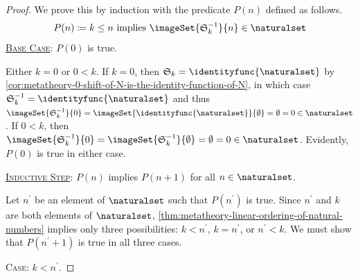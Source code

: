 \begin{proof}
    We prove this by induction with the predicate \( P(n) \) defined as follows.
    \begin{equation*}
        P(n) \coloneq \text{\( k \leq n \) implies \( \imageSet{\mathfrak{S}^{-1}_{k}}{n} \in \naturalset \)}
    \end{equation*}
    \noindent
    \underline{\scshape Base Case}: \( P(0) \) is true.

    \vspace{0.3cm}
    \noindent
    Either \( k = 0 \) or \( 0 < k \).
    If \( k = 0 \), then \( \mathfrak{S}_{k} = \identityfunc{\naturalset} \) by \cref{cor:metatheory-0-shift-of-N-is-the-identity-function-of-N},
    in which case \( \mathfrak{S}_{k}^{-1} = \identityfunc{\naturalset} \) and thus \( \imageSet{\mathfrak{S}^{-1}_{k}}{0} = \imageSet{ \identityfunc{\naturalset} }{\emptyset} = \emptyset = 0 \in \naturalset \).
    If \( 0 < k \), then \( \imageSet{\mathfrak{S}^{-1}_{k}}{0} = \imageSet{\mathfrak{S}^{-1}_{k}}{\emptyset} = \emptyset = 0 \in \naturalset \).
    Evidently, \( P(0) \) is true in either case.

    \vspace{0.3cm}
    \noindent
    \underline{\scshape Inductive Step}: \( P(n) \) implies \( P(n + 1) \) for all \( n \in \naturalset \).

    \vspace{0.3cm}
    \noindent
    Let \( n^{\prime} \) be an element of \( \naturalset \) such that \( P(n^{\prime}) \) is true.
    Since \( n^{\prime} \) and \( k \) are both elements of \( \naturalset \), \cref{thm:metatheory-linear-ordering-of-natural-numbers} implies only three possibilities:
    \( k < n^{\prime} \), \( k = n^{\prime} \), or \( n^{\prime} < k \).
    We must show that \( P(n^{\prime} + 1) \) is true in all three cases.

    \vspace{0.3cm}
    \noindent
    {\scshape Case}: \( k < n^{\prime} \).


\end{proof}
